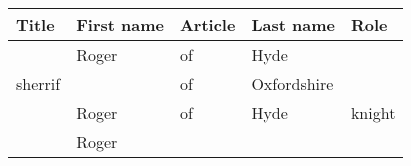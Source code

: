 \begin{tabular}{l l l l l}
	\toprule
	\textbf{Title} & \textbf{First name} & \textbf{Article} & \textbf{Last name} & \textbf{Role} \\
	\midrule
	& Roger & of & Hyde        & \\
	sherrif &       & of & Oxfordshire & \\
	& Roger & of & Hyde        & knight \\
	& Roger &    &             & \\
	\bottomrule
\end{tabular}
